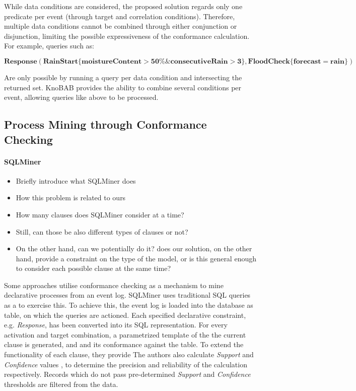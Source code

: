 While data conditions are considered, the proposed solution regards only one predicate per event (through target and correlation conditions). Therefore, multiple data conditions cannot be combined through either conjunction or disjunction, limiting the possible expressiveness of the conformance calculation. For example, queries such as:

$\mathbf{Response(RainStart \{moistureContent>50\%  \& consecutiveRain>3\}, FloodCheck\{forecast=rain\})}$

Are only possible by running a query per data condition and intersecting the returned set. KnoBAB provides the ability to combine several conditions per event, allowing queries like above to be processed.


\subsection{Process Mining through Conformance Checking}
\paragraph*{SQLMiner}
\begin{itemize}
	\item{Briefly introduce what SQLMiner does}
	\item{How this problem is related to ours}
	\item{How many clauses does SQLMiner consider at a time?}
	\item{Still, can those be also different types of clauses or not?}
	\item{On the other hand, can we potentially do it? does our solution, on the other hand, provide a constraint on the type of the model, or is this general enough to consider each possible clause at the same time?}
\end{itemize}
Some approaches utilise conformance checking as a mechanism to mine declarative processes from an event log. SQLMiner \cite{SchonigRCJM16} uses traditional SQL queries \cite{Schonig15} as a to exercise this. To achieve this, the event log is loaded into the database as table, on which the queries are actioned. Each specified declarative constraint, e.g. \emph{Response}, has been converted into its SQL representation. For every activation and target combination, a parametrized template of the the current clause is generated, and and its conformance against the table. To extend the functionality of each clause, they provide  The authors also calculate \emph{Support} and \emph{Confidence} values \cite{DiCiccio2015}, to determine the precision and reliability of the calculation respectively. Records which do not pass pre-determined \emph{Support} and \emph{Confidence} thresholds are filtered from the data. 

